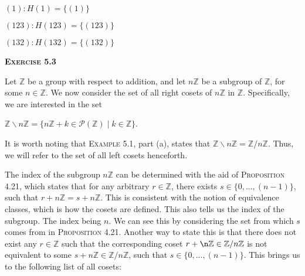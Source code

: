 \documentclass[12pt, a4paper]{article}
\begin{document}
\begin{description}
\item{\hspace{4mm}$(1) : $}\hspace{1mm}$H(1)=\{(1)\}$
\item{$(123) : $}\hspace{1mm}$H(123)=\{(123)\}$
\item{$(132) : $}\hspace{1mm}$H(132)=\{(132)\}$
\end{description}

\vspace{2mm}

\begin{flushleft}
\textbf{\textsc{Exercise 5.3}}
\end{flushleft}

\vspace{2mm}

Let $\mathbb{Z}$ be a group with respect to addition, and let $n\mathbb{Z}$ be a subgroup of $\mathbb{Z}$, for some $n\in\mathbb{Z}$. We now consider the set of all right cosets of $n\mathbb{Z}$ in $\mathbb{Z}$. Specifically, we are interested in the set\par

\vspace{6mm}

\centerline{$\mathbb{Z}\backslash n\mathbb{Z}=\{n\mathbb{Z}+k\in\mathscr{P}(\mathbb{Z})\mid k\in\mathbb{Z}\}$.}

\vspace{8mm}

It is worth noting that \textsc{Example 5.1}, part (a), states that $\mathbb{Z}\backslash n\mathbb{Z}=\mathbb{Z}/n\mathbb{Z}$. Thus, we will refer to the set of all left cosets henceforth.

\newpage

The index of the subgroup $n\mathbb{Z}$ can be determined with the aid of \textsc{Proposition 4.21}, which states that for any arbitrary $r\in\mathbb{Z}$, there exists $s\in \{0, ... , (n-1)\}$, such that $r+n\mathbb{Z}=s+n\mathbb{Z}$. This is consistent with the notion of equivalence classes, which is how the cosets are defined. This also tells us the index of the subgroup. The index being $n$. We can see this by considering the set from which $s$ comes from in \textsc{Proposition 4.21}. Another way to state this is that there does not exist any $r\in\mathbb{Z}$ such that the corresponding coset $r+\n\mathbb{Z}\in\mathbb{Z}/n\mathbb{Z}$ is not equivalent to some $s+n\mathbb{Z}\in\mathbb{Z}/n\mathbb{Z}$, such that $s\in\{0, ... , (n-1)\}$. This brings us to the following list of all cosets:\par
\end{document}
